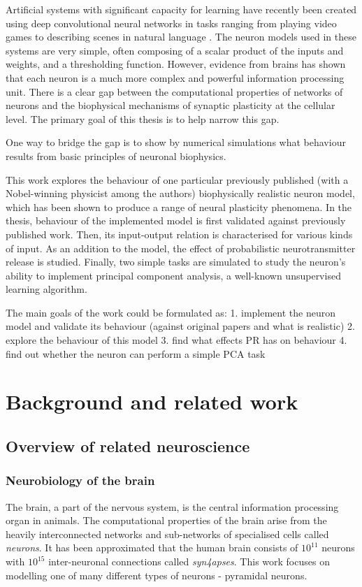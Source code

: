 \documentclass[a4paper,12pt]{report}
\theoremstyle{definition}
\begin{document}
Artificial systems with significant capacity for learning have recently been created using deep convolutional neural networks in tasks ranging from playing video games \cite{mnih2015human} to describing scenes in natural language \cite{karpathy2014deep}. The neuron models used in these systems are very simple, often composing of a scalar product of the inputs and weights, and a thresholding function. However, evidence from brains has shown that each neuron is a much more complex and powerful information processing unit. There is a clear gap between the computational properties of networks of neurons and the biophysical mechanisms of synaptic plasticity at the cellular level. The primary goal of this thesis is to help narrow this gap.

One way to bridge the gap is to show by numerical simulations what behaviour results from basic principles of neuronal biophysics.

This work explores the behaviour of one particular previously published (with a Nobel-winning physicist among the authors) biophysically realistic neuron model, which has been shown to produce a range of neural plasticity phenomena. In the thesis, behaviour of the implemented model is first validated against previously published work. Then, its input-output relation is characterised for various kinds of input. As an addition to the model, the effect of probabilistic neurotransmitter release is studied. Finally, two simple tasks are simulated to study the neuron's ability to implement principal component analysis, a well-known unsupervised learning algorithm.

The main goals of the work could be formulated as:
1. implement the neuron model and validate its behaviour (against original papers and what is realistic)
2. explore the behaviour of this model
3. find what effects PR has on behaviour
4. find out whether the neuron can perform a simple PCA task


\chapter{Background and related work}


\section{Overview of related neuroscience}

\subsection{Neurobiology of the brain}
The brain, a part of the nervous system, is the central information processing organ in animals. The computational properties of the brain arise from the heavily interconnected networks and sub-networks of specialised cells called \emph{neurons}. It has been approximated \cite{herculano2009human} that the human brain consists of $10^{11}$ neurons with $10^{15}$ inter-neuronal connections called \emph{syn4apses}. This work focuses on modelling one of many different types of neurons - pyramidal neurons.
\end{document}
